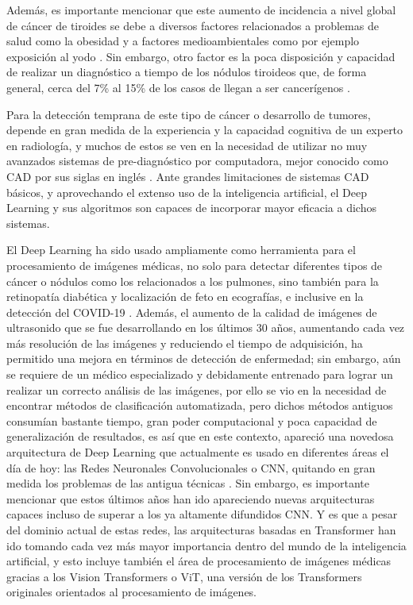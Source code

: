 Además, es importante mencionar que este aumento de incidencia a nivel global de cáncer de tiroides se debe a diversos factores relacionados a problemas de salud como la obesidad y a factores medioambientales como por ejemplo exposición al yodo \parencite{pr_kim2020geoinflu}. Sin embargo, otro factor es la poca disposición y capacidad de realizar un diagnóstico a tiempo de los nódulos tiroideos que, de forma general, cerca del 7\% al 15\% de los casos de llegan a ser cancerígenos \parencite{pr_haugen2016amethy}.

Para la detección temprana de este tipo de cáncer o desarrollo de tumores, depende en gran medida de la experiencia y la capacidad cognitiva de un experto en radiología, y muchos de estos se ven en la necesidad de utilizar no muy avanzados sistemas de pre-diagnóstico por computadora, mejor conocido como CAD por sus siglas en inglés \parencite{pr_zhu2021agendlframew}. Ante grandes limitaciones de sistemas CAD básicos, y aprovechando el extenso uso de la inteligencia artificial, el Deep Learning y sus algoritmos son capaces de incorporar mayor eficacia a dichos sistemas.

El Deep Learning ha sido usado ampliamente como herramienta para el procesamiento de imágenes médicas, no solo para detectar diferentes tipos de cáncer o nódulos como los relacionados a los pulmones, sino también para la retinopatía diabética y localización de feto en ecografías, e inclusive en la detección del COVID-19 \parencite{pr_bhatta2021medimage}. Además, el aumento de la calidad de imágenes de ultrasonido que se fue desarrollando en los últimos 30 años, aumentando cada vez más resolución de las imágenes y reduciendo el tiempo de adquisición, ha permitido una mejora en términos de detección de enfermedad; sin embargo, aún se requiere de un médico especializado y debidamente entrenado para lograr un realizar un correcto análisis de las imágenes, por ello se vio en la necesidad de encontrar métodos de clasificación automatizada, pero dichos métodos antiguos consumían bastante tiempo, gran poder computacional y poca capacidad de generalización de resultados, es así que en este contexto, apareció una novedosa arquitectura de Deep Learning que actualmente es usado en diferentes áreas el día de hoy: las Redes Neuronales Convolucionales o CNN, quitando en gran medida los problemas de las antigua técnicas \parencite{pr_signgh20203ddl}. Sin embargo, es importante mencionar que estos últimos años han ido apareciendo nuevas arquitecturas capaces incluso de superar a los ya altamente difundidos CNN. Y es que a pesar del dominio actual de estas redes, las arquitecturas basadas en Transformer han ido tomando cada vez más mayor importancia dentro del mundo de la inteligencia artificial, y esto incluye también el área de procesamiento de imágenes médicas gracias a los Vision Transformers o ViT, una versión de los Transformers originales orientados al procesamiento de imágenes.
 
